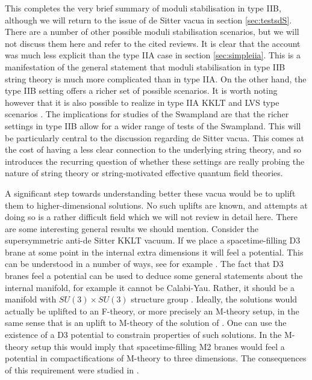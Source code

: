 \documentclass[11pt,a4paper]{article}
\numberwithin{equation}{section}
\numberwithin{table}{section}\setlength{\multlinegap}{25pt}
\begin{document}
This completes the very brief summary of moduli stabilisation in type IIB, although we will return to the issue of de Sitter vacua in section \ref{sec:testsdS}. There are a number of other possible moduli stabilisation scenarios, but we will not discuss them here and refer to the cited reviews. It is clear that the account was much less explicit than the type IIA case in section \ref{sec:simpleiia}. This is a manifestation of the general statement that moduli stabilisation in type IIB string theory is much more complicated than in type IIA. On the other hand, the type IIB setting offers a richer set of possible scenarios. It is worth noting however that it is also possible to realize in type IIA KKLT and LVS type scenarios \cite{Palti:2008mg}. The implications for studies of the Swampland are that the richer settings in type IIB allow for a wider range of tests of the Swampland. This will be particularly central to the discussion regarding de Sitter vacua. This comes at the cost of having a less clear connection to the underlying string theory, and so introduces the recurring question of whether these settings are really probing the nature of string theory or string-motivated effective quantum field theories. 

A significant step towards understanding better these vacua would be to uplift them to higher-dimensional solutions. No such uplifts are known, and attempts at doing so is a rather difficult field which we will not review in detail here. There are some interesting general results we should mention. Consider the supersymmetric anti-de Sitter KKLT vacuum. If we place a spacetime-filling D3 brane at some point in the internal extra dimensions it will feel a potential. This can be understood in a number of ways, see for example \cite{Baumann:2006th,Koerber:2007xk,Marchesano:2009rz}. The fact that D3 branes feel a potential can be used to deduce some general statements about the internal manifold, for example it cannot be Calabi-Yau. Rather, it should be a manifold with $SU(3)\times SU(3)$ structure group \cite{Koerber:2007xk}. Ideally, the solutions would actually be uplifted to an F-theory, or more precisely an M-theory setup, in the same sense that \cite{Becker:1996gj} is an uplift to M-theory of the solution of \cite{Giddings:2001yu}. One can use the existence of a D3 potential to constrain properties of such solutions. In the M-theory setup this would imply that spacetime-filling M2 branes would feel a potential in compactifications of M-theory to three dimensions. The consequences of this requirement were studied in \cite{Condeescu:2013hya}.
\end{document}
